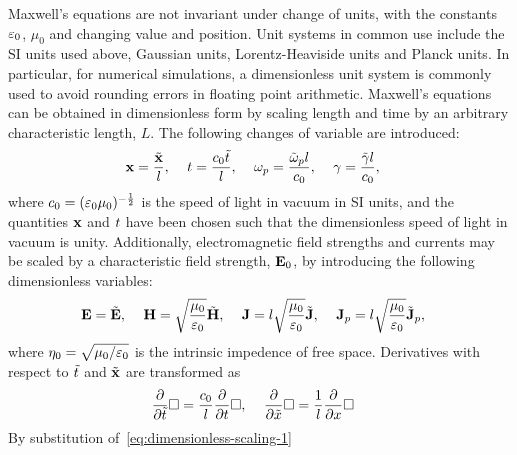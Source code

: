 Maxwell's equations are not invariant under change of units, with the constants
$\varepsilon_0$, $\mu_0$ and changing value and position. Unit systems in common
use include the SI units used above, Gaussian units, Lorentz-Heaviside units and
Planck units. In particular, for numerical simulations, a dimensionless unit
system is commonly used to avoid rounding errors in floating point arithmetic.
Maxwell's equations can be obtained in dimensionless form by scaling length and
time by an arbitrary characteristic length, $L$. The following changes of
variable are introduced:
\begin{align}
  \label{eq:dimensionless-scaling-1}
  \mathbf{x} &= \frac{\tilde{\mathbf{x}}}{l}, &  \
                                        t &= \frac{c_0 \tilde{t}}{l}, &  \
                                                                           \omega_p &= \frac{\tilde{\omega}_p l}{c_0}, & \
                                                                                                                                  \gamma &= \frac{\tilde{\gamma} l}{c_0},
\end{align}
where $c_0 = ( \varepsilon_0 \mu_0 )^{-\frac{1}{2}}$ is the speed of light in vacuum
in SI units, and the quantities $\mathbf{x}$ and $t$ have been chosen such that the
dimensionless speed of light in vacuum is unity. Additionally, electromagnetic
field strengths and currents may be scaled by a characteristic field strength,
$\mathbf{E}_0$, by introducing the following dimensionless variables:
\begin{align}
  \label{eq:dimensionless-scaling-2}
  \mathbf{E} &= \tilde{\mathbf{E}}, &  \
                   \mathbf{H} &= \sqrt{\frac{\mu_0}{\varepsilon_0}} \tilde{\mathbf{H}}, &  \
                                              \mathbf{J} &= l \sqrt{\frac{\mu_0}{\varepsilon_0}} \tilde{\mathbf{J}}, & \
                                                                                  \mathbf{J}_p &= l \sqrt{\frac{\mu_0}{\varepsilon_0}} \tilde{\mathbf{J}}_p,
\end{align}
where $\eta_0 = \sqrt{\mu_0 / \varepsilon_0}$ is the intrinsic impedence of free space.
Derivatives with respect to $\tilde{t}$ and $\tilde{\mathbf{x}}$ are transformed as
\begin{align}
  \label{eq:dimensionless-scaling-3}
  \frac{\partial}{\partial \tilde{t} } \Box &= \frac{c_0}{l}\frac{\partial}{\partial t} \Box, & \
                                                        \frac{\partial}{\partial \tilde{x}} \Box &= \frac{1}{l}\frac{\partial}{\partial x} \Box
\end{align}
By substitution of~\eqref{eq:dimensionless-scaling-1}
